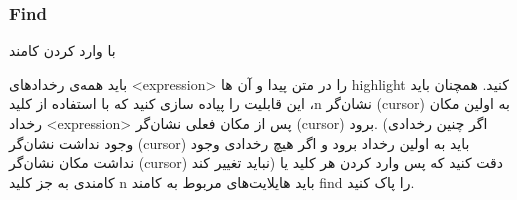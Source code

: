 \subsubsection*{{\titr Find}}


با وارد کردن کامند


باید همه‌ی رخدادهای <expression> را در متن پیدا و آن ها highlight کنید.
همچنان باید این قابلیت را پیاده سازی کنید که با استفاده از کلید ،n نشان‌گر (cursor) به اولین مکان رخداد <expression> پس از مکان فعلی نشان‌گر (cursor) برود. (اگر چنین رخدادی وجود نداشت نشان‌گر (cursor) باید  به اولین رخداد برود و اگر هیچ رخدادی وجود نداشت مکان نشان‌گر (cursor) نباید تغییر کند)
دقت کنید که پس وارد کردن هر کلید یا کامندی به جز کلید n باید هایلایت‌های مربوط به کامند find را پاک کنید.
